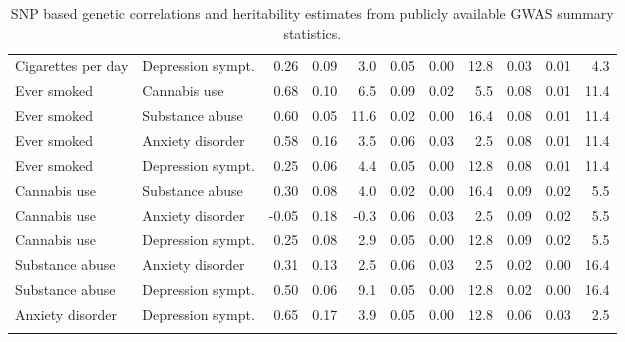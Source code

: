 {\begin{longtable}{llrrrrrrrrr}
  Cigarettes per day & Depression sympt. & 0.26 & 0.09 & 3.0 & 0.05 & 0.00 & 12.8 & 0.03 & 0.01 & 4.3 \\ 
  Ever smoked & Cannabis use & 0.68 & 0.10 & 6.5 & 0.09 & 0.02 & 5.5 & 0.08 & 0.01 & 11.4 \\ 
  Ever smoked & Substance abuse & 0.60 & 0.05 & 11.6 & 0.02 & 0.00 & 16.4 & 0.08 & 0.01 & 11.4 \\ 
  Ever smoked & Anxiety disorder & 0.58 & 0.16 & 3.5 & 0.06 & 0.03 & 2.5 & 0.08 & 0.01 & 11.4 \\ 
  Ever smoked & Depression sympt. & 0.25 & 0.06 & 4.4 & 0.05 & 0.00 & 12.8 & 0.08 & 0.01 & 11.4 \\ 
  Cannabis use & Substance abuse & 0.30 & 0.08 & 4.0 & 0.02 & 0.00 & 16.4 & 0.09 & 0.02 & 5.5 \\ 
  Cannabis use & Anxiety disorder & -0.05 & 0.18 & -0.3 & 0.06 & 0.03 & 2.5 & 0.09 & 0.02 & 5.5 \\ 
  Cannabis use & Depression sympt. & 0.25 & 0.08 & 2.9 & 0.05 & 0.00 & 12.8 & 0.09 & 0.02 & 5.5 \\ 
  Substance abuse & Anxiety disorder & 0.31 & 0.13 & 2.5 & 0.06 & 0.03 & 2.5 & 0.02 & 0.00 & 16.4 \\ 
  Substance abuse & Depression sympt. & 0.50 & 0.06 & 9.1 & 0.05 & 0.00 & 12.8 & 0.02 & 0.00 & 16.4 \\ 
  Anxiety disorder & Depression sympt. & 0.65 & 0.17 & 3.9 & 0.05 & 0.00 & 12.8 & 0.06 & 0.03 & 2.5 \\ 
  \hline
  \caption{SNP based genetic correlations and heritability estimates from publicly available GWAS summary statistics.} 
  \label{tab:rg}
\end{longtable}
\renewcommand{\arraystretch}{1}
}